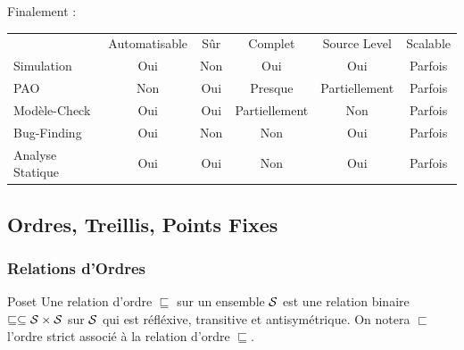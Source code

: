 \documentclass{cours}
\begin{document}
Finalement :
\begin{center}
	\begin{NiceTabular}{lccccc}
		                 & Automatisable              & Sûr                        & Complet                               & Source Level                          & Scalable              \\
		Simulation       & \color{green!40!black} Oui & \color{red!70!black} Non   & \color{green!40!black} Oui            & \color{green!40!black} Oui            & \color{brown} Parfois \\
		PAO              & \color{red!70!black} Non   & \color{green!40!black} Oui & \color{blue!40!black} Presque         & \color{orange!70!black} Partiellement & \color{brown} Parfois \\
		Modèle-Check     & \color{green!40!black} Oui & \color{green!40!black} Oui & \color{orange!70!black} Partiellement & \color{red!70!black} Non              & \color{brown} Parfois \\
		Bug-Finding      & \color{green!40!black} Oui & \color{red!70!black} Non   & \color{red!70!black} Non              & \color{green!40!black} Oui            & \color{brown} Parfois \\
		Analyse Statique & \color{green!40!black} Oui & \color{green!40!black} Oui & \color{red!70!black} Non              & \color{green!40!black} Oui            & \color{brown} Parfois

		\CodeAfter
	\end{NiceTabular}
\end{center}

\subsection{Ordres, Treillis, Points Fixes}
\subsubsection{Relations d'Ordres}
\begin{définition}{Poset}{}
Une relation d'ordre $\sqsubseteq$ sur un ensemble $\mathcal{S}$ est une relation binaire $\sqsubseteq \subseteq \mathcal{S} \times \mathcal{S}$ sur $\mathcal{S}$ qui est réfléxive, transitive et antisymétrique. On notera $\sqsubset$ l'ordre strict associé à la relation d'ordre $\sqsubseteq$.
\end{définition}
\end{document}
